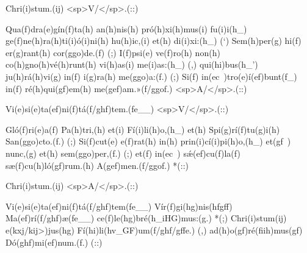 Chri(i)stum.(ij) <sp>V/</sp>.(::)

Qua(f)dra(e)gín(f)ta(h) an(h)nis(h) pró(h)xi(h)mus(i) fu(i)i(h_)
ge(f)ne(h)ra(h)ti(i)ó(i)ni(h) hu(h)ic,(i)
et(h) di(i)xi:(h_) (`)
Sem(h)per(g) hi(f) er(g)rant(h) cor(ggo)de.(f) (;)
I(f)psi(e) ve(f)ro(h) non(h) co(h)gno(h)vé(h)runt(h) vi(h)as(i) me(i)as:(h_) (,)
qui(hi)bus(h_') ju(h)rá(h)vi(g) in(f) i(g)ra(h) me(ggo)a:(f.) (;)
Si(f) in(ec~)tro(e)í(ef)bunt(f_)
in(f) ré(h)qui(gf)em(h) me(gef)am.»(f/ggof.) <sp>A/</sp>.(::)

Vi(e)si(e)ta(ef)ni(f)tá(f/ghf)tem.(fe__) <sp>V/</sp>.(::)

Gló(f)ri(e)a(f) Pa(h)tri,(h) et(i) Fí(i)li(h)o,(h_)
et(h) Spi(g)rí(f)tu(g)i(h) San(ggo)cto.(f.) (;)
Si(f)cut(e) e(f)rat(h) in(h) prin(i)cí(i)pi(h)o,(h_)
et(gf~) nunc,(g) et(h) sem(ggo)per,(f.) (;)
et(f) in(ec~) sǽ(ef)cu(f)la(f) sæ(f)cu(h)ló(gf)rum.(h) A(gef)men.(f/ggof.) *(::)

Chri(i)stum.(ij) <sp>A/</sp>.(::)

Vi(e)si(e)ta(ef)ni(f)tá(f/ghf)tem(fe__) Vír(f)gi(hg)nis(hfgff) Ma(ef)rí(f/ghf)æ(fe__) ce(f)le(hg)bré(h_iHG)mus:(g.) *(;)
Chri(i)stum(ij) e(kxj/kij>)jus(hg) Fí(hi)li(hv_GF)um(f/ghf/gffe.) (,)
ad(h)o(gf)ré(fiih)mus(gf) Dó(ghf)mi(ef)num.(f.) (::)
